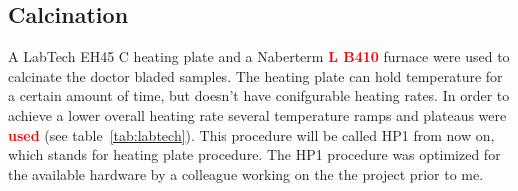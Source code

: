 \documentclass[a4paper]{article}
\newcommand{\todo}[1]{\textbf{\textcolor{red}{#1}}}
\newcommand{\td}[1]{\textbf{\textcolor{red}{#1}}}
\newcommand{\minutes}[1]{\SI{#1}{\minute}}
\newcommand{\oc}[1]{\SI{#1}{\degreeCelsius}}
\begin{document}
\subsection{Calcination}
A LabTech EH45 C heating plate and a Naberterm \td{L B410} furnace were used to calcinate the doctor bladed samples. 
The heating plate can hold temperature for a certain amount of time, but doesn't have conifgurable heating rates.
In order to achieve a lower overall heating rate several temperature ramps and plateaus were \todo{used} (see table~\ref{tab:labtech}).
This procedure will be called HP1 from now on, which stands for heating plate procedure.
The HP1 procedure was optimized for the available hardware by a colleague working on the the project prior to me.
\end{document}

